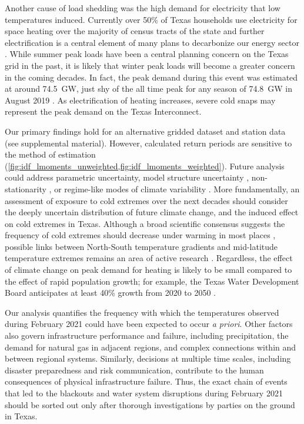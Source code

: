 \documentclass[12pt]{iopart}
\begin{document}
Another cause of load shedding was the high demand for electricity that low temperatures induced.
Currently over 50\% of Texas households use electricity for space heating over the majority of census tracts of the state \cite{waite_heating:2020} and further electrification is a central element of many plans to decarbonize our energy sector \cite{williams_decarbonization:2012,davis:2018,white_txresidential:2019}.
While summer peak loads have been a central planning concern on the Texas grid in the past, it is likely that winter peak loads will become a greater concern in the coming decades.
In fact, the peak demand during this event was estimated at around \SI{74.5}{\giga\watt}, just shy of the all time peak for any season of \SI{74.8}{\giga\watt} in August 2019 \cite{everhart_iea:2021}.
As electrification of heating increases, severe cold snaps may represent the peak demand on the Texas Interconnect.

Our primary findings hold for an alternative gridded dataset and station data (see supplemental material).
However, calculated return periods are sensitive to the method of estimation (\cref{fig:idf_lmoments_unweighted,fig:idf_lmoments_weighted}).
Future analysis could address parametric uncertainty, model structure uncertainty \cite{wong_floodrisk:2018}, non-stationarity \cite{Milly:2008dg}, or regime-like modes of climate variability \cite{DossGollin:2019}.
More fundamentally, an assessment of exposure to cold extremes over the next decades should consider the deeply uncertain distribution of future climate change, and the induced effect on cold extremes in Texas.
Although a broad scientific consensus suggests the frequency of cold extremes should decrease under warming in most places \cite{ipcc_ar5:2014}, possible links between North-South temperature gradients and mid-latitude temperature extremes remains an area of active research \cite{Barnes:2013fp,Cohen:2014gx,Screen:2013ho}.
Regardless, the effect of climate change on peak demand for heating is likely to be small compared to the effect of rapid population growth; for example, the Texas Water Development Board anticipates at least 40\% growth from 2020 to 2050 \cite{texaswaterplan:2012}.

Our analysis quantifies the frequency with which the temperatures observed during February 2021 could have been expected to occur \emph{a priori}.
Other factors also govern infrastructure performance and failure, including precipitation, the demand for natural gas in adjacent regions, and complex connections within and between regional systems.
Similarly, decisions at multiple time scales, including disaster preparedness and risk communication, contribute to the human consequences of physical infrastructure failure.
Thus, the exact chain of events that led to the blackouts and water system disruptions during February 2021 should be sorted out only after thorough investigations by parties on the ground in Texas.
\end{document}
